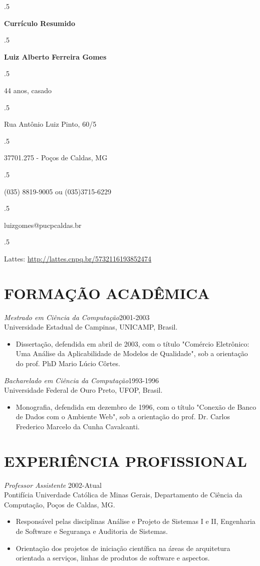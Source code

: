 \documentclass[margin, 10pt]{res}
\begin{document}
\moveleft.5\hoffset\centerline{\bf Currículo Resumido} 
\moveleft.5\hoffset\centerline{\large\bf Luiz Alberto Ferreira Gomes}
\moveleft.5\hoffset\centerline{44 anos, casado}
\moveleft.5\hoffset\centerline{Rua Antônio Luiz Pinto, 60/5}
\moveleft.5\hoffset\centerline{37701.275 - Poços de Caldas, MG }
\moveleft.5\hoffset\centerline{(035) 8819-9005 ou (035)3715-6229}
\moveleft.5\hoffset\centerline{luizgomes@pucpcaldas.br} 
\moveleft.5\hoffset\centerline{Lattes: \url{http://lattes.cnpq.br/5732116193852474}}

\begin{resume}
  \section{FORMAÇÃO ACADÊMICA}
  {\sl Mestrado em Ciência da Computação}\hfill 2001-2003\\
  Universidade Estadual de Campinas, UNICAMP, Brasil. 
  \begin{itemize} \itemsep -2pt 
    \item Dissertação, defendida em abril de 2003, com o título "Comércio Eletrônico: Uma Análise da Aplicabilidade de Modelos de Qualidade",
    sob a orientação do prof. PhD Mario Lúcio Côrtes.
  \end{itemize}

  {\sl Bacharelado em Ciência da Computação}\hfill 1993-1996\\
  Universidade Federal de Ouro Preto, UFOP, Brasil. 
  \begin{itemize} \itemsep -2pt 
    \item Monografia, defendida em dezembro de 1996, com o título "Conexão de Banco de Dados com o Ambiente Web", sob a orientação do prof. Dr. 
    Carlos Frederico Marcelo da Cunha Cavalcanti.  
  \end{itemize}

  \section{EXPERIÊNCIA PROFISSIONAL}
  {\sl Professor Assistente} \hfill 2002-Atual \\
  Pontifícia Univerdade Católica de Minas Gerais, Departamento de Ciência da Computação, Poços de Caldas, MG. 
    \begin{itemize} \itemsep -2pt %
      \item Responsável pelas disciplinas Análise e Projeto de Sistemas I e II, Engenharia de Software e Segurança e Auditoria de Sistemas.
      \item Orientação dos projetos de iniciação científica na áreas de arquitetura orientada a serviços, linhas de produtos de software e aspectos.     
   \end{itemize}
   

\end{resume}
\end{document}
